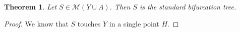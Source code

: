 \documentclass{article}
\newcommand{\M}{\mathcal{M}}
\newtheorem{theorem}{Theorem}[section]
\theoremstyle{definition}
\theoremstyle{remark}
\begin{document}
\begin{theorem}\label{th:main}
Let $S\in \M(Y\cup A)$. 
Then $S$ is the standard bifurcation tree.
\end{theorem}
\begin{proof}
We know that $S$ touches $Y$ in a single point $H$.

\end{proof}
\end{document}
